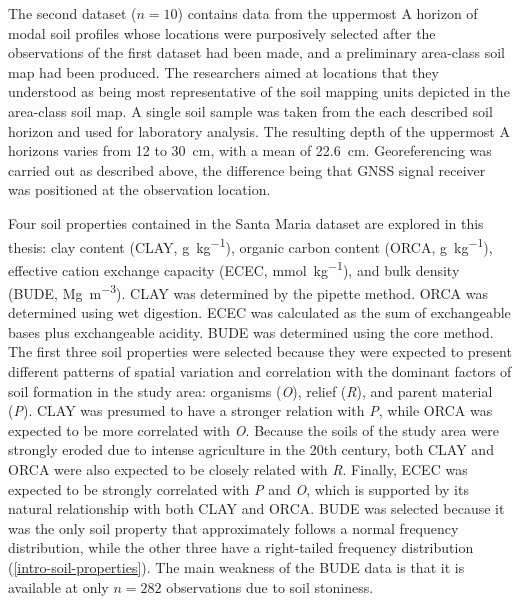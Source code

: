 The second dataset ($n = 10$) contains data from the uppermost A horizon of modal soil profiles 
whose locations were purposively selected after the observations of the first dataset had been made, 
and a preliminary area-class soil map had been produced. The researchers aimed at locations that 
they understood as being most representative of the soil mapping units depicted in the area-class 
soil map. A single soil sample was taken from the each described soil horizon and used for 
laboratory analysis. The resulting depth of the uppermost A horizons varies from \num{12} to 
\SI{30}{\centi\metre}, with a mean of \SI{22.6}{\centi\metre}. Georeferencing was carried out as 
described above, the difference being that GNSS signal receiver was positioned at the observation 
location.

Four soil properties contained in the Santa Maria dataset are explored in this thesis: clay content
(CLAY, \si{\gram\per\kilo\gram}), organic carbon content (ORCA, \si{\gram\per\kilo\gram}), effective
cation exchange capacity (ECEC, \si{\milli\mole\per\kilo\gram}), and bulk density (BUDE, 
\si{\mega\gram\per\cubic\metre}). CLAY was determined by the pipette method. ORCA was determined 
using wet digestion. ECEC was calculated as the sum of exchangeable bases plus exchangeable acidity.
BUDE was determined using the core method. The first three soil properties were selected because 
they were expected to present different patterns of spatial variation and correlation with the 
dominant factors of soil formation in the study area: organisms (\textit{O}), relief (\textit{R}), 
and parent material (\textit{P}). CLAY was presumed to have a stronger relation with \textit{P}, 
while ORCA was expected to be more correlated with \textit{O}. Because the soils of the study area 
were strongly eroded due to intense agriculture in the 20th century, both CLAY and ORCA were also 
expected to be closely related with \textit{R}. Finally, ECEC was expected to be strongly correlated
with \textit{P} and \textit{O}, which is supported by its natural relationship with both CLAY and 
ORCA. BUDE was selected because it was the only soil property that approximately follows a normal 
frequency distribution, while the other three have a right-tailed frequency distribution 
(\autoref{intro-soil-properties}). The main weakness of the BUDE data is that it is available at 
only $n = 282$ observations due to soil stoniness.

